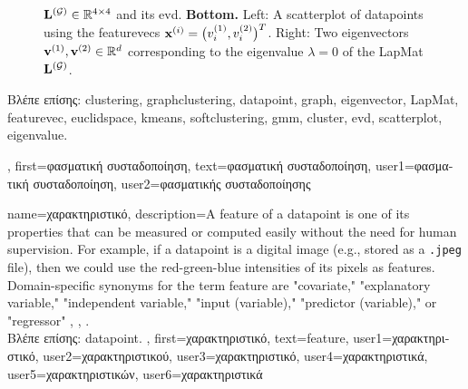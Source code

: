 {{\begin{figure}[H]
\begin{center}
{					${\bf L}^{(\mathcal{G})}  \in \mathbb{R}^{4 \times 4}$ and its \gls{evd}. 
					{\bf Bottom.} Left: A \gls{scatterplot} of \gls{datapoint}s using the \gls{featurevec}s 
					${\bf x}^{(i)} = \big( v^{(1)}_{i},v^{(2)}_{i} \big)^{T}$. 
					Right: Two \gls{eigenvector}s ${\bf v}^{(1)},{\bf v}^{(2)} \in \mathbb{R}^{d}$ 
					corresponding to the \gls{eigenvalue} $\lambda=0$ of the \gls{LapMat} ${\bf L}^{(\mathcal{G})}$. 
					} 
			\end{center}
		\end{figure}
	\newpage
	\foreignlanguage{greek}{Βλέπε επίσης:} \gls{clustering}, \gls{graphclustering}, \gls{datapoint}, \gls{graph}, \gls{eigenvector}, \gls{LapMat}, \gls{featurevec}, \gls{euclidspace}, \gls{kmeans}, \gls{softclustering}, \gls{gmm}, \gls{cluster}, \gls{evd}, \gls{scatterplot}, \gls{eigenvalue}.}, 
	first={\foreignlanguage{greek}{φασματική συσταδοποίηση}},
	text={\foreignlanguage{greek}{φασματική συσταδοποίηση}},
	user1={\foreignlanguage{greek}{φασματική συσταδοποίηση}}, %
    	user2={\foreignlanguage{greek}{φασματικής συσταδοποίησης}} %
}


{name={\foreignlanguage{greek}{χαρακτηριστικό}},
	description={A feature of a \gls{datapoint} is one of its properties that can be 
		measured or computed easily without the need for human supervision. For example, if a \gls{datapoint} 
		is a digital image (e.g., stored as a \texttt{.jpeg} file), then we could use the red-green-blue intensities 
		of its pixels as features. Domain-specific synonyms for the term feature are "covariate," "explanatory variable," 
		"independent variable," "input (variable)," "predictor (variable)," or "regressor" \cite{Gujarati2021}, \cite{Dodge2003}, \cite{Everitt2022}.\\
		\foreignlanguage{greek}{Βλέπε επίσης:} \gls{datapoint}.
		}, first={\foreignlanguage{greek}{χαρακτηριστικό}},
		text={feature},
		user1={\foreignlanguage{greek}{χαρακτηριστικό}}, %
		user2={\foreignlanguage{greek}{χαρακτηριστικού}}, %
		user3={\foreignlanguage{greek}{χαρακτηριστικό}}, %
		user4={\foreignlanguage{greek}{χαρακτηριστικά}}, %
		user5={\foreignlanguage{greek}{χαρακτηριστικών}}, %
		user6={\foreignlanguage{greek}{χαρακτηριστικά}} %
}

